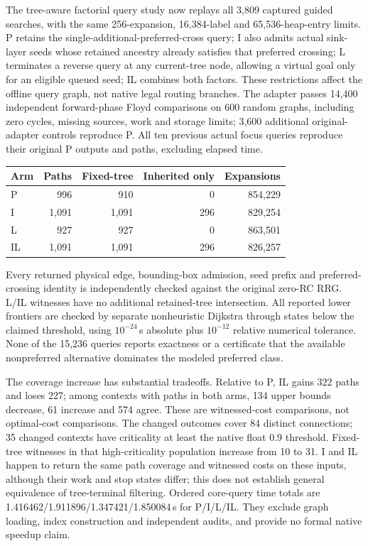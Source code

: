 The tree-aware factorial query study now replays all 3,809 captured guided searches, with the same 256-expansion, 16,384-label and 65,536-heap-entry limits. P retains the single-additional-preferred-cross query; I also admits actual sink-layer seeds whose retained ancestry already satisfies that preferred crossing; L terminates a reverse query at any current-tree node, allowing a virtual goal only for an eligible queued seed; IL combines both factors. These restrictions affect the offline query graph, not native legal routing branches. The adapter passes 14,400 independent forward-phase Floyd comparisons on 600 random graphs, including zero cycles, missing sources, work and storage limits; 3,600 additional original-adapter controls reproduce P. All ten previous actual focus queries reproduce their original P outputs and paths, excluding elapsed time.

\begin{center}\small
\begin{tabular}{lrrrr}
\hline
Arm & Paths & Fixed-tree & Inherited only & Expansions\\
\hline
P & 996 & 910 & 0 & 854,229\\
I & 1,091 & 1,091 & 296 & 829,254\\
L & 927 & 927 & 0 & 863,501\\
IL & 1,091 & 1,091 & 296 & 826,257\\
\hline
\end{tabular}
\end{center}

Every returned physical edge, bounding-box admission, seed prefix and preferred-crossing identity is independently checked against the original zero-RC RRG. L/IL witnesses have no additional retained-tree intersection. All reported lower frontiers are checked by separate nonheuristic Dijkstra through states below the claimed threshold, using $10^{-24}$\,s absolute plus $10^{-12}$ relative numerical tolerance. None of the 15,236 queries reports exactness or a certificate that the available nonpreferred alternative dominates the modeled preferred class.

The coverage increase has substantial tradeoffs. Relative to P, IL gains 322 paths and loses 227; among contexts with paths in both arms, 134 upper bounds decrease, 61 increase and 574 agree. These are witnessed-cost comparisons, not optimal-cost comparisons. The changed outcomes cover 84 distinct connections; 35 changed contexts have criticality at least the native float 0.9 threshold. Fixed-tree witnesses in that high-criticality population increase from 10 to 31. I and IL happen to return the same path coverage and witnessed costs on these inputs, although their work and stop states differ; this does not establish general equivalence of tree-terminal filtering. Ordered core-query time totals are 1.416462/1.911896/1.347421/1.850084\,s for P/I/L/IL. They exclude graph loading, index construction and independent audits, and provide no formal native speedup claim.

